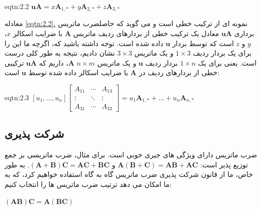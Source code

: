{\begin{spacing}{1.5}
        \begin{eqtn}{eqtn:2.2}
            \centering
            $\textbf{uA}=x\textbf{A}_{1,*}+y\textbf{A}_{2,*}+z\textbf{A}_{3,*}$
        \end{eqtn}

        معادله \hyperref[eqtn:2.2]{\ref{eqtn:2.2}.} نمونه ای از ترکیب خطی است و
        می گوید که حاصلضرب ماتریس برداری $\textbf{uA}$ معادل یک ترکیب خطی از بردارهای ردیف ماتریس $\textbf{A}$ با ضرایب اسکالر $x$، $y$ و $z$ است که توسط بردار $\textbf{u}$ داده شده است.
        توجه داشته باشید که، اگرچه ما این را برای یک بردار ردیف $1\times 3$ و یک ماتریس $3\times 3$ نشان دادیم، نتیجه به طور کلی درست است.
        یعنی برای یک $1\times n$ بردار ردیف $\textbf{u}$ و یک ماتریس $n\times m$ $\textbf{A}$، داریم که $\textbf{uA}$ ترکیبی خطی از بردارهای ردیف در $\textbf{A}$ با ضرایب اسکالر داده شده توسط $\textbf{u}$ است:

        \begin{eqtn}{eqtn:2.3}
            \centering
            $[u_{1},\dots,u_{n}]\begin{bmatrix}
                                    A_{11} & \cdots & A_{13} \\
                                    \vdots & \ddots & \vdots \\
                                    A_{31} & \cdots & A_{33}
            \end{bmatrix}=u_{1}\textbf{A}_{1,*}+\dots+u_{n}\textbf{A}_{n,*}$
        \end{eqtn}
    \end{spacing}
}

\subsection{\textbf{شرکت پذیری}}
\label{subsec:2.2.3}
{
    \Large
    \begin{spacing}{1.5}
        ضرب ماتریس دارای ویژگی های جبری خوبی است. برای مثال، ضرب ماتریسی بر جمع توزیع پذیر است: $\textbf{A}(\textbf{B}+\textbf{C})=\textbf{AB}+\textbf{AC}$ و $(\textbf{A}+\textbf{B})\textbf{C}=\textbf{AC}+\textbf{BC}$.
        به طور خاص، ما از قانون شرکت پذیری ضرب ماتریس گاه به گاه استفاده خواهیم کرد، که به ما امکان می دهد ترتیب ضرب ماتریس ها را انتخاب کنیم:

        \begin{center}
            $(\textbf{AB})\textbf{C}=\textbf{A}(\textbf{BC})$
        \end{center}

    \end{spacing}
}


